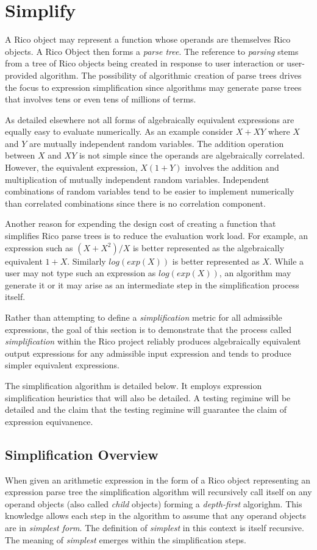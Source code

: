 \section{Simplify}
A Rico object may represent a function whose operands are themselves Rico objects. A Rico Object then forms a \emph{parse tree}. The reference to \emph{parsing} stems from a tree of Rico objects being created in response to user interaction or user-provided algorithm. The possibility of algorithmic creation of parse trees drives the focus to expression simplification since algorithms may generate parse trees that involves tens or even tens of millions of terms.

As detailed elsewhere not all forms of algebraically equivalent expressions are equally easy to evaluate numerically. As an example consider $X + XY$ where $X$ and $Y$ are mutually independent random variables. The addition operation between $X$ and $XY$ is not simple since the operands are algebraically correlated. However, the equivalent expression, $X(1+Y)$ involves the addition and multiplication of mutually independent random variables. Independent combinations of random variables tend to be easier to implement numerically than correlated combinations since there is no correlation component.

Another reason for expending the design cost of creating a function that simplifies Rico parse trees is to reduce the evaluation work load. For example, an expression such as $(X+X^2)/X$ is better represented as the algebraically equivalent $1+X$. Similarly $log(exp(X))$ is better represented as $X$. While a user may not type such an expression as $log(exp(X))$, an algorithm may generate it or it may arise as an intermediate step in the simplification process itself.

Rather than attempting to define a \emph{simplification} metric for all admissible expressions, the goal of this section is to demonstrate that the process called \emph{simplification} within the Rico project reliably produces algebraically equivalent output expressions for any admissible input expression and tends to produce simpler equivalent expressions. 

The simplification algorithm is detailed below. It employs expression simplification heuristics that will also be detailed. A testing regimine will be detailed and the claim that the testing regimine will guarantee the claim of expression equivanence. 

\subsection{Simplification Overview}
When given an arithmetic expression in the form of a Rico object representing an expression parse tree the simplification algorithm will recursively call itself on any operand objects (also called \emph{child} objects) forming a \emph{depth-first} algorighm. This knowledge allows each step in the algorithm to assume that any operand objects are in \emph{simplest form}. The definition of \emph{simplest} in this context is itself recursive. The meaning of \emph{simplest} emerges within the simplification steps.

